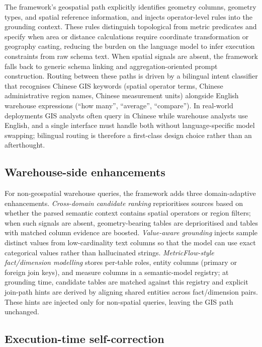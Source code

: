 \documentclass[11pt]{article}
\begin{document}
The framework's geospatial path explicitly identifies geometry columns, geometry types, and spatial reference information, and injects operator-level rules into the grounding context. These rules distinguish topological from metric predicates and specify when area or distance calculations require coordinate transformation or geography casting, reducing the burden on the language model to infer execution constraints from raw schema text. When spatial signals are absent, the framework falls back to generic schema linking and aggregation-oriented prompt construction. Routing between these paths is driven by a bilingual intent classifier that recognises Chinese GIS keywords (spatial operator terms, Chinese administrative region names, Chinese measurement units) alongside English warehouse expressions (``how many'', ``average'', ``compare''). In real-world deployments GIS analysts often query in Chinese while warehouse analysts use English, and a single interface must handle both without language-specific model swapping; bilingual routing is therefore a first-class design choice rather than an afterthought.

\subsection{Warehouse-side enhancements}

For non-geospatial warehouse queries, the framework adds three domain-adaptive enhancements. \emph{Cross-domain candidate ranking} reprioritises sources based on whether the parsed semantic context contains spatial operators or region filters; when such signals are absent, geometry-bearing tables are deprioritised and tables with matched column evidence are boosted. \emph{Value-aware grounding} injects sample distinct values from low-cardinality text columns so that the model can use exact categorical values rather than hallucinated strings. \emph{MetricFlow-style fact/dimension modelling} stores per-table roles, entity columns (primary or foreign join keys), and measure columns in a semantic-model registry; at grounding time, candidate tables are matched against this registry and explicit join-path hints are derived by aligning shared entities across fact/dimension pairs. These hints are injected only for non-spatial queries, leaving the GIS path unchanged.

\subsection{Execution-time self-correction}
\end{document}
